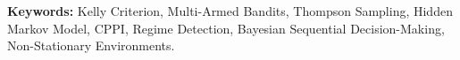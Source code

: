 \documentclass[12pt,oneside]{book}
\begin{document}
\bigskip
\noindent\textbf{Keywords:} Kelly Criterion, Multi-Armed Bandits, Thompson
Sampling, Hidden Markov Model, CPPI, Regime Detection, Bayesian Sequential
Decision-Making, Non-Stationary Environments.

\tableofcontents










\end{document}
